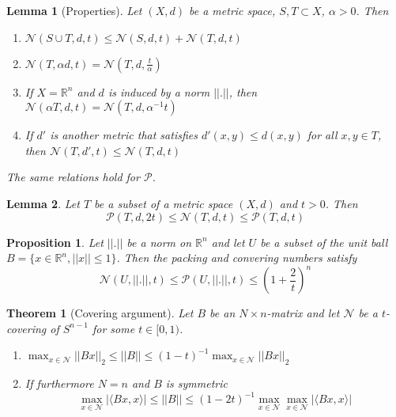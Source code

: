 \documentclass[10pt,a4paper]{article}
\theoremstyle{thmstyle}
\newtheorem{lemma}{Lemma}
\newtheorem{theorem}{Theorem}
\newtheorem{proposition}{Proposition}
\begin{document}
\begin{lemma}[Properties]
  Let $(X, d)$ be a metric space, $S, T \subset X$, $\alpha > 0$.
  Then
  \begin{enumerate}
  \item $\mathcal{N}(S \cup T, d, t) \le \mathcal{N}(S, d, t) + \mathcal{N}(T, d, t)$
  \item $\mathcal{N}(T, \alpha d, t) = \mathcal{N}\left( T, d, \frac{t}{\alpha} \right)$
  \item If $X = \mathbb{R}^{n}$ and $d$ is induced by a norm $||.||$, then $\mathcal{N}(\alpha T, d, t) = \mathcal{N}(T, d, \alpha^{-1} t)$
  \item If $d'$ is another metric that satisfies $d'(x, y) \le d(x, y)$ for all $x, y \in T$, then $\mathcal{N}(T, d', t) \le \mathcal{N}(T, d, t)$
  \end{enumerate}
  The same relations hold for $\mathcal{P}$.
\end{lemma}

\begin{lemma}
  Let $T$ be a subset of a metric space $(X, d)$ and $t > 0$.
  Then
  \begin{equation*}
    \mathcal{P}(T, d, 2t) \le \mathcal{N}(T, d, t) \le \mathcal{P}(T, d, t)
  \end{equation*}
\end{lemma}

\begin{proposition}
  Let $||.||$ be a norm on $\mathbb{R}^{n}$ and let $U$ be a subset of the unit ball $B = \{ x \in \mathbb{R}^{n}, ||x|| \le 1 \}$.
  Then the packing and convering numbers satisfy
  \begin{equation*}
    \mathcal{N}(U, ||.||, t) \le \mathcal{P}(U, ||.||, t) \le \left( 1 + \frac{2}{t} \right)^{n}
  \end{equation*}
\end{proposition}

\begin{theorem}[Covering argument]
  Let $B$ be an $N \times n$-matrix and let $\mathcal{N}$ be a $t$-covering of $S^{n - 1}$ for some $t \in [0, 1)$.
  \begin{enumerate}
  \item $\max_{x \in \mathcal{N}} ||Bx||_{2} \le ||B|| \le (1 - t)^{-1} \max_{x \in \mathcal{N}} ||Bx||_{2}$
  \item If furthermore $N = n$ and $B$ is symmetric
    \begin{equation*}
      \max_{x \in \mathcal{N}} |\langle Bx, x \rangle| \le ||B|| \le (1 - 2t)^{-1} \max_{x \in \mathcal{N}} \max_{x \in \mathcal{N}} |\langle Bx, x \rangle|
    \end{equation*}
  \end{enumerate}
\end{theorem}
\end{document}
